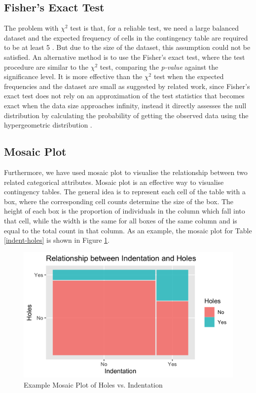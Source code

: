 \documentclass[11pt, oneside]{article}
\begin{document}
\subsection{Fisher's Exact Test}
The problem with $\chi^2$ test is that, for a reliable test, we need a large balanced dataset and the expected frequency of cells in the contingency table are required to be at least 5 \cite{mcdonald}. But due to the size of the dataset, this assumption could not be satisfied.
\bigbreak
\noindent An alternative method is to use the Fisher's exact test, where the test procedure are similar to the $\chi^2$ test, comparing the \textit{p-value} against the significance level. It is more effective than the $\chi^2$ test when the expected frequencies and the dataset are small as suggested by related work, since Fisher's exact test does not rely on an approximation of the test statistics that becomes exact when the data size approaches infinity, instead it directly assesses the null distribution by calculating the probability of getting the observed data using the hypergeometric distribution \cite{mcdonald}.

\subsection{Mosaic Plot}
Furthermore, we have used mosaic plot to visualise the relationship between two related categorical attributes. Mosaic plot is an effective way to visualise contingency tables. The general idea is to represent each cell of the table with a box, where the corresponding cell counts determine the size of the box. The height of each box is the proportion of individuals in the column which fall into that cell, while the width is the same for all boxes of the same column and is equal to the total count in that column. As an example, the mosaic plot for Table \ref{indent-holes} is shown in Figure \ref{mosaic_example}.

\begin{figure}[H]
    \centering
    \includegraphics[scale=0.2]{images/indent_holes_sample.png}
    \caption{Example Mosaic Plot of Holes vs. Indentation}
    \label{mosaic_example}
\end{figure}
\end{document}
